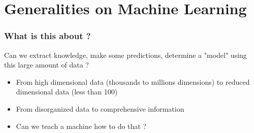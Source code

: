 \documentclass[handout]{beamer}
\begin{document}
\section{Generalities on Machine Learning}
\begin{frame}
\frametitle{What is this about ?}
\begin{alertblock}{Can we extract knowledge, make some predictions, determine a "model" using this large
amount of data ?}

\end{alertblock}
\pause
\begin{figure}
\end{figure}
\pause
\begin{itemize}
\item From high dimensional data (thousands to millions dimensions) to reduced dimensional data (less than 100)
\item From disorganized data to comprehensive information
\item \alert{Can we teach a machine how to do that ?}
\end{itemize}

\end{frame}
\end{document}
